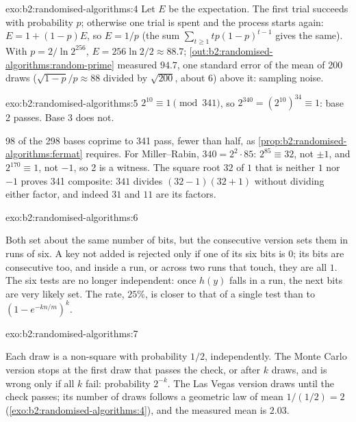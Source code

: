 \begin{solution}{exo:b2:randomised-algorithms:4}
Let $E$ be the expectation. The first trial succeeds with probability $p$; otherwise one trial is spent and the process
starts again: $E = 1 + (1 - p)E$, so $E = 1/p$ (the sum $\sum_{t \geq 1} t p (1 - p)^{t - 1}$ gives the same). With $p =
2/\ln 2^{256}$, $E = 256 \ln 2 / 2 \approx 88.7$; \cref{out:b2:randomised-algorithms:random-prime} measured $94.7$, one standard error of the mean of
200 draws ($\sqrt{1 - p}/p \approx 88$ divided by $\sqrt{200}$, about 6) above it: sampling noise.
\end{solution}

\begin{solution}{exo:b2:randomised-algorithms:5}
$2^{10} \equiv 1 \pmod{341}$, so $2^{340} = (2^{10})^{34} \equiv 1$: base 2 passes. Base 3 does not.


98 of the 298 bases coprime to 341 pass, fewer than half, as \cref{prop:b2:randomised-algorithms:fermat} requires. For
Miller--Rabin, $340 = 2^2 \cdot 85$: $2^{85} \equiv 32$, not $\pm 1$, and $2^{170} \equiv 1$, not $-1$, so 2 is a
witness. The square root $32$ of $1$ that is neither $1$ nor $-1$ proves 341 composite: $341$ divides $(32 - 1)(32 + 1)$
without dividing either factor, and indeed $31$ and $11$ are its factors.
\end{solution}

\begin{solution}{exo:b2:randomised-algorithms:6}

Both set about the same number of bits, but the consecutive version sets them in runs of six. A key not added is
rejected only if one of its six bits is $0$; its bits are consecutive too, and inside a run, or across two runs that
touch, they are all $1$. The six tests are no longer independent: once $h(y)$ falls in a run, the next bits are very
likely set. The rate, $25\%$, is closer to that of a single test than to $(1 - e^{-kn/m})^k$.
\end{solution}

\begin{solution}{exo:b2:randomised-algorithms:7}

Each draw is a non-square with probability $1/2$, independently. The Monte Carlo version stops at the first draw that
passes the check, or after $k$ draws, and is wrong only if all $k$ fail: probability $2^{-k}$. The Las Vegas version
draws until the check passes; its number of draws follows a geometric law of mean $1/(1/2) = 2$
(\cref{exo:b2:randomised-algorithms:4}), and the measured mean is $2.03$.
\end{solution}

